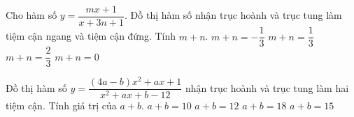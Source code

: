 \begin{ex}%
	Cho hàm số $y=\dfrac{mx+1}{x+3n+1}$. Đồ thị hàm số nhận trục hoành và trục tung làm tiệm cận ngang và tiệm cận đứng. Tính $m+n$.
	\choice
	{\True $m+n=-\dfrac{1}{3}$}
	{$m+n=\dfrac{1}{3}$}
	{$m+n=\dfrac{2}{3}$}
	{$m+n=0$}
\end{ex}

\begin{ex}%
	Đồ thị hàm số $y=\dfrac{(4a-b)x^2+ax+1}{x^2+ax+b-12}$ nhận trục hoành và trục tung làm hai tiệm cận. Tính giá trị của $a+b$.
	\choice
	{$a+b=10$}
	{$a+b=12$}
	{$a+b=18$}
	{\True $a+b=15$}
\end{ex}


